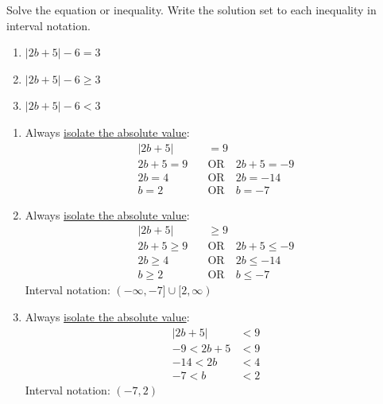 \documentclass{ximera}
\begin{document}
\begin{problem}
Solve the equation or inequality. Write the solution set to each inequality in interval notation.
\begin{enumerate}
  \item[(a)] $|2b+5| - 6 = 3$
  \medskip
  \item[(b)] $|2b+5| - 6 \geq 3$
  \medskip
  \item[(c)] $|2b+5| - 6 < 3$
\end{enumerate}

\begin{solution}
\begin{enumerate}
  \item[(a)] Always \underline{isolate the absolute value}:
  \begin{align*}
    |2b+5| &= 9\\
    2b+5 = 9 \quad &\text{OR}\quad 2b+5 = -9\\
    2b = 4 \quad &\text{OR}\quad 2b = -14\\
    b = 2 \quad &\text{OR}\quad b = -7
  \end{align*}

  \item[(b)] Always \underline{isolate the absolute value}:
  \begin{align*}
    |2b+5| &\geq 9\\
    2b+5 \geq 9 \quad &\text{OR}\quad 2b+5 \leq -9\\
    2b \geq 4 \quad &\text{OR}\quad 2b \leq -14\\
    b \geq 2 \quad &\text{OR}\quad b \leq -7
  \end{align*}
  Interval notation: $(-\infty,-7] \cup [2,\infty)$

  \item[(c)] Always \underline{isolate the absolute value}:
  \begin{align*}
    |2b+5| &< 9\\
    -9 < 2b+5 &< 9\\
    -14 < 2b &< 4\\
    -7 < b &< 2
  \end{align*}
  Interval notation: $(-7,2)$
\end{enumerate}
\end{solution}
\end{problem}
\end{document}
